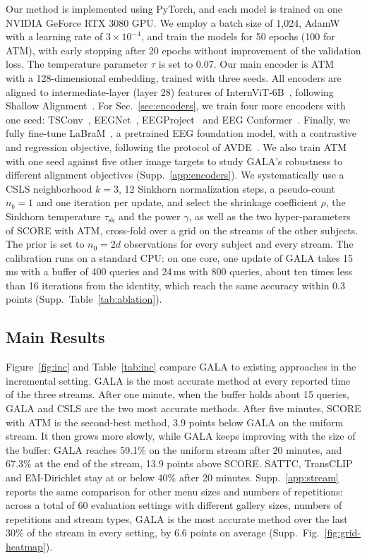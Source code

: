 \documentclass[10pt,twocolumn,letterpaper]{article}
\begin{document}
Our method is implemented using PyTorch, and each model is trained on one NVIDIA GeForce RTX 3080 GPU. We employ a batch size of 1,024, AdamW with a learning rate of $3\times10^{-4}$, and train the models for 50 epochs (100 for ATM), with early stopping after 20 epochs without improvement of the validation loss. The temperature parameter $\tau$ is set to 0.07. Our main encoder is ATM~\cite{li2024atm} with a 128-dimensional embedding, trained with three seeds. All encoders are aligned to intermediate-layer (layer 28) features of InternViT-6B~\cite{chen2024internvl}, following Shallow Alignment~\cite{du2025shallow}. For Sec.~\ref{sec:encoders}, we train four more encoders with one seed: TSConv~\cite{song2024nice}, EEGNet~\cite{lawhern2018eegnet}, EEGProject~\cite{du2025shallow} and EEG Conformer~\cite{song2023eegconformer}. Finally, we fully fine-tune LaBraM~\cite{jiang2024labram}, a pretrained EEG foundation model, with a contrastive and regression objective, following the protocol of AVDE~\cite{dai2026avde}.
We also train ATM with one seed against five other image targets to study GALA's robustness to different alignment objectives (Supp.~\ref{app:encoders}). We systematically use a CSLS neighborhood $k=3$, 12 Sinkhorn normalization steps, a pseudo-count $n_b=1$ and one iteration per update, and select the shrinkage coefficient $\rho$, the Sinkhorn temperature $\tau_{\mathrm{sk}}$ and the power $\gamma$, as well as the two hyper-parameters of SCORE with ATM, cross-fold over a grid on the streams of the other subjects. The prior is set to $n_0 = 2d$ observations for every subject and every stream. The calibration runs on a standard CPU: on one core, one update of GALA takes 15\,ms with a buffer of 400 queries and 24\,ms with 800 queries, about ten times less than 16 iterations from the identity, which reach the same accuracy within 0.3 points (Supp.~Table~\ref{tab:ablation}).

\subsection{Main Results}
\label{sec:inc}

Figure~\ref{fig:inc} and Table~\ref{tab:inc} compare GALA to existing approaches in the incremental setting. GALA is the most accurate method at every reported time of the three streams. After one minute, when the buffer holds about 15 queries, GALA and CSLS are the two most accurate methods. After five minutes, SCORE with ATM is the second-best method, 3.9 points below GALA on the uniform stream. It then grows more slowly, while GALA keeps improving with the size of the buffer: GALA reaches 59.1\% on the uniform stream after 20 minutes, and 67.3\% at the end of the stream, 13.9 points above SCORE. SATTC, TransCLIP and EM-Dirichlet stay at or below 40\% after 20 minutes. Supp.~\ref{app:stream} reports the same comparison for other menu sizes and numbers of repetitions: across a total of 60 evaluation settings with different gallery sizes, numbers of repetitions and stream types, GALA is the most accurate method over the last 30\% of the stream in every setting, by 6.6 points on average (Supp.~Fig.~\ref{fig:grid-heatmap}).
\end{document}
